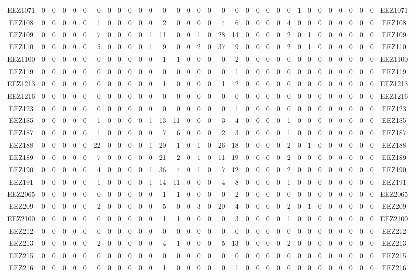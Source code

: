 \documentclass[10pt,a4paper,twoside]{report}
\begin{document}
{\begin{tabular}{crrrrrrrrrrrrrrrrrrrrrrrrrrrrrrrc}
EEZ1071&0&0&0&0&0&0&0&0&0&0&0&0&0&0&0&0&0&0&0&0&0&0&0&1&0&0&0&0&0&0&0&EEZ1071\\
EEZ108&0&0&0&0&0&1&0&0&0&0&0&2&0&0&0&0&4&6&0&0&0&0&4&0&0&0&0&0&0&0&0&EEZ108\\
EEZ109&0&0&0&0&0&7&0&0&0&0&1&11&0&0&1&0&28&14&0&0&0&0&2&0&1&0&0&0&0&0&0&EEZ109\\
EEZ110&0&0&0&0&0&5&0&0&0&0&1&9&0&0&2&0&37&9&0&0&0&0&2&0&1&0&0&0&0&0&0&EEZ110\\
EEZ1100&0&0&0&0&0&0&0&0&0&0&0&1&1&0&0&0&0&2&0&0&0&0&0&0&0&0&0&0&0&0&0&EEZ1100\\
EEZ119&0&0&0&0&0&0&0&0&0&0&0&0&0&0&0&0&0&1&0&0&0&0&0&0&0&0&0&0&0&0&0&EEZ119\\
EEZ1213&0&0&0&0&0&0&0&0&0&0&0&1&0&0&0&0&1&2&0&0&0&0&0&0&0&0&0&0&0&0&0&EEZ1213\\
EEZ1216&0&0&0&0&0&0&0&0&0&0&0&0&0&0&0&0&0&0&0&0&0&0&0&0&0&0&0&0&0&0&0&EEZ1216\\
EEZ123&0&0&0&0&0&0&0&0&0&0&0&0&0&0&0&0&0&1&0&0&0&0&0&0&0&0&0&0&0&0&0&EEZ123\\
EEZ185&0&0&0&0&0&1&0&0&0&0&1&13&11&0&0&0&3&4&0&0&0&0&1&0&0&0&0&0&0&0&0&EEZ185\\
EEZ187&0&0&0&0&0&1&0&0&0&0&0&7&6&0&0&0&2&3&0&0&0&0&1&0&0&0&0&0&0&0&0&EEZ187\\
EEZ188&0&0&0&0&0&22&0&0&0&0&1&20&1&0&1&0&26&18&0&0&0&0&2&0&1&0&0&0&0&0&0&EEZ188\\
EEZ189&0&0&0&0&0&7&0&0&0&0&0&21&2&0&1&0&11&19&0&0&0&0&2&0&0&0&0&0&0&0&0&EEZ189\\
EEZ190&0&0&0&0&0&4&0&0&0&0&1&36&4&0&1&0&7&12&0&0&0&0&2&0&0&0&0&0&0&0&0&EEZ190\\
EEZ191&0&0&0&0&0&1&0&0&0&0&1&14&11&0&0&0&4&8&0&0&0&0&1&0&0&0&0&0&0&0&0&EEZ191\\
EEZ2065&0&0&0&0&0&0&0&0&0&0&0&1&1&0&0&0&0&2&0&0&0&0&0&0&0&0&0&0&0&0&0&EEZ2065\\
EEZ209&0&0&0&0&0&2&0&0&0&0&0&5&0&0&3&0&20&4&0&0&0&0&2&0&1&0&0&0&0&0&0&EEZ209\\
EEZ2100&0&0&0&0&0&0&0&0&0&0&0&1&1&0&0&0&0&3&0&0&0&0&1&0&0&0&0&0&0&0&0&EEZ2100\\
EEZ212&0&0&0&0&0&0&0&0&0&0&0&0&0&0&0&0&0&0&0&0&0&0&0&0&0&0&0&0&0&0&0&EEZ212\\
EEZ213&0&0&0&0&0&2&0&0&0&0&0&4&1&0&0&0&5&13&0&0&0&0&2&0&0&0&0&0&0&0&0&EEZ213\\
EEZ215&0&0&0&0&0&0&0&0&0&0&0&0&0&0&0&0&0&0&0&0&0&0&0&0&0&0&0&0&0&0&0&EEZ215\\
EEZ216&0&0&0&0&0&0&0&0&0&0&0&1&0&0&0&0&0&1&0&0&0&0&0&0&0&0&0&0&0&0&0&EEZ216\\

\end{tabular}}
\end{document}
